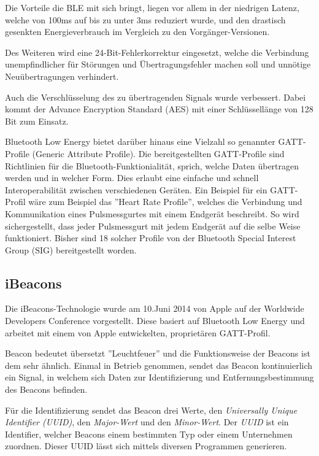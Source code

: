 Die Vorteile die BLE mit sich bringt, liegen vor allem in der niedrigen Latenz, welche von 100ms auf bis zu unter 3ms reduziert wurde, und den drastisch gesenkten Energieverbrauch im Vergleich zu den Vorgänger-Versionen.

Des Weiteren wird eine 24-Bit-Fehlerkorrektur eingesetzt, welche die Verbindung unempfindlicher für Störungen und Übertragungsfehler machen soll und unnötige Neuübertragungen verhindert.

Auch die Verschlüsselung des zu übertragenden Signals wurde verbessert. Dabei kommt der Advance Encryption Standard (AES) mit einer Schlüssellänge von 128 Bit zum Einsatz.

Bluetooth Low Energy bietet darüber hinaus eine Vielzahl so genannter GATT-Profile (Generic Attribute Profile). Die bereitgestellten GATT-Profile sind Richtlinien für die Bluetooth-Funktionialität, sprich, welche Daten übertragen werden und in welcher Form. Dies erlaubt eine einfache und schnell Interoperabilität zwischen verschiedenen Geräten. Ein Beispiel für ein GATT-Profil wäre zum Beispiel das ''Heart Rate Profile'', welches die Verbindung und Kommunikation eines Pulsmessgurtes mit einem Endgerät beschreibt. So wird sichergestellt, dass jeder Pulsmessgurt mit jedem Endgerät auf die selbe Weise funktioniert. Bisher sind 18 solcher Profile von der Bluetooth Special Interest Group (SIG) bereitgestellt worden. 



\subsection{iBeacons}
\label{sec:technologies:bluetoothLE:ibeacons}
Die iBeacons-Technologie wurde am 10.Juni 2014 von Apple auf der Worldwide Developers Conference vorgestellt. 
Diese basiert auf Bluetooth Low Energy und arbeitet mit einem von Apple entwickelten, proprietären GATT-Profil.

Beacon bedeutet übersetzt ''Leuchtfeuer'' und die Funktionsweise der Beacons ist dem sehr ähnlich.
Einmal in Betrieb genommen, sendet das Beacon kontinuierlich ein Signal, in welchem sich Daten zur Identifizierung und Entfernungsbestimmung des Beacons befinden.

Für die Identifizierung sendet das Beacon drei Werte, den \emph{Universally Unique Identifier (UUID)}, den \emph{Major-Wert} und den \emph{Minor-Wert}.
Der \emph{UUID} ist ein Identifier, welcher Beacons einem bestimmten Typ oder einem Unternehmen zuordnen. Dieser UUID lässt sich mittels diversen Programmen generieren.

